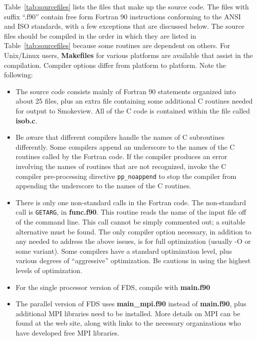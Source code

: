 \documentclass[11pt]{book}
\newcommand{\ct}{\tt\small}
\begin{document}
Table~\ref{tab:sourcefiles} lists the files that make up the source code.
The files with suffix ``.f90'' contain free form Fortran 90
instructions conforming to the ANSI and ISO standards, with a few exceptions that are discussed below.
The source files should be compiled in the order in which they are listed
in Table~\ref{tab:sourcefiles} because some routines are dependent on others.
For Unix/Linux users, {\bf Makefiles} for various platforms are available that assist in the
compilation. Compiler options differ from platform to platform.
Note the following:
\begin{itemize}
\item The source code consists mainly of Fortran 90
statements organized into about 25 files, plus an extra file containing
some additional C routines needed for output to Smokeview.
All of the C code is contained within the file called {\bf isob.c}.
\item Be aware that different
compilers handle the names of C subroutines differently. Some compilers
append an underscore to the names of the C routines called by the Fortran
code. If the compiler produces an error involving the names of routines
that are not recognized, invoke the C compiler pre-processing directive {\ct pp\_noappend} to stop
the compiler from appending the underscore to the names of the C routines.
\item There is only one non-standard calls in the Fortran code. The non-standard call is {\ct GETARG},
in {\bf func.f90}. This routine reads the name of the input file off of the command line. This call cannot
be simply commented out; a suitable alternative must be found.
The only compiler option necessary, in addition to any needed to
address the above issues, is for full optimization (usually -O or some variant). Some
compilers have a standard optimization level, plus various degrees of
``aggressive'' optimization. Be cautious in using the highest levels of optimization.
\item For the single processor version of FDS, compile with {\bf main.f90}
\item The parallel version of FDS uses {\bf main\_mpi.f90} instead of
{\bf main.f90}, plus additional MPI libraries need to be installed. More details on MPI can be found at the web site, along with links to the
necessary organizations who have developed free MPI libraries.
\end{itemize}
\end{document}
